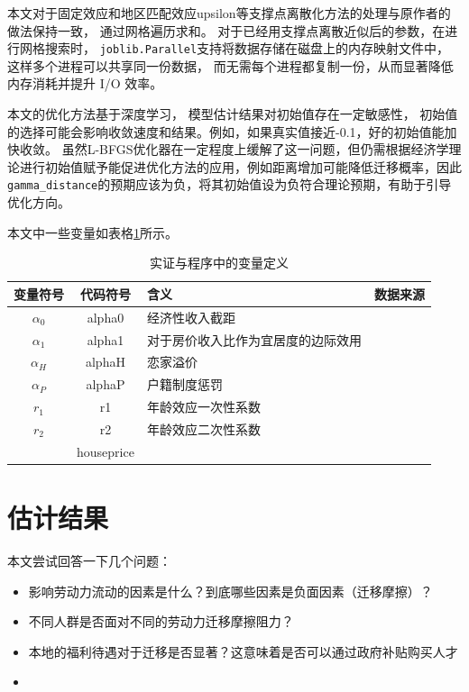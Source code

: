 \documentclass[
  a4paper,
  zihao=-4,
  fontset=mac,
  AutoFakeBold,
  AutoFakeSlant,
  oneside]{ctexbook}
\begin{document}
本文对于固定效应和地区匹配效应upsilon等支撑点离散化方法的处理与原作者的做法保持一致，
通过网格遍历求和。
对于已经用支撑点离散近似后的参数，在进行网格搜索时，
\lstinline{joblib.Parallel}支持将数据存储在磁盘上的内存映射文件中，这样多个进程可以共享同一份数据，
而无需每个进程都复制一份，从而显著降低内存消耗并提升 I/O 效率。

本文的优化方法基于深度学习，
模型估计结果对初始值存在一定敏感性，
初始值的选择可能会影响收敛速度和结果。例如，如果真实值接近-0.1，好的初始值能加快收敛。
虽然L-BFGS优化器在一定程度上缓解了这一问题，但仍需根据经济学理论进行初始值赋予能促进优化方法的应用，例如距离增加可能降低迁移概率，因此\lstinline{gamma_distance}的预期应该为负，将其初始值设为负符合理论预期，有助于引导优化方向。


本文中一些变量如表格\ref{tab:_实证与程序中的变量定义}所示。

\begin{table}
\centering
\caption{实证与程序中的变量定义}
\begin{tabularx}{\textwidth}{@{}ccXX@{}}
\toprule
变量符号 & 代码符号 & 含义 & 数据来源\\
\midrule
$\alpha_0$ & alpha0 & 经济性收入截距 &\\
$\alpha_1$ & alpha1 & 对于房价收入比作为宜居度的边际效用&\\
$\alpha_H$ & alphaH & 恋家溢价&\\
$\alpha_P$ & alphaP & 户籍制度惩罚&\\
$r_1$ & r1 & 年龄效应一次性系数& \\
$r_2$ & r2 & 年龄效应二次性系数& \\
 & houseprice & &\\
\bottomrule
\end{tabularx}
\label{tab:_实证与程序中的变量定义}
\end{table}

\chapter{估计结果}

本文尝试回答一下几个问题：
\begin{itemize}
  \item 影响劳动力流动的因素是什么？到底哪些因素是负面因素（迁移摩擦）？
  \item 不同人群是否面对不同的劳动力迁移摩擦阻力？
  \item 本地的福利待遇对于迁移是否显著？这意味着是否可以通过政府补贴购买人才
  \item 
\end{itemize}
\end{document}
